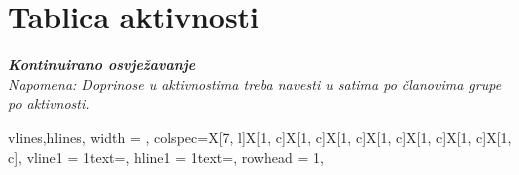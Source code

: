 \begin{packed_enum}
			
		\end{packed_enum}
		
		\eject
		\section*{Tablica aktivnosti}
		
			\textbf{\textit{Kontinuirano osvježavanje}}\\
			
			 \textit{Napomena: Doprinose u aktivnostima treba navesti u satima po članovima grupe po aktivnosti.}

			\begin{longtblr}[
					label=none,
				]{
					vlines,hlines,
					width = \textwidth,
					colspec={X[7, l]X[1, c]X[1, c]X[1, c]X[1, c]X[1, c]X[1, c]X[1, c]}, 
					vline{1} = {1}{text=\clap{}},
					hline{1} = {1}{text=\clap{}},
					rowhead = 1,
				} 
			

\end{longtblr}
